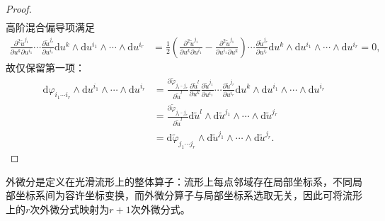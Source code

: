 \documentclass[../../main.tex]{subfiles}%
\begin{document}
\begin{proof}
\begin{align*}
\end{align*}
高阶混合偏导项满足
\begin{align*}
\frac{\partial^2\tilde{u}^{j_1}}{\partial u^k\partial u^{i_1}}\cdots\frac{\partial\tilde{u}^{j_r}}{\partial u^{i_r}}\mathrm{d}u^k\land\mathrm{d}u^{i_1}\land\cdots\land\mathrm{d}u^{i_r} &= \frac{1}{2}\left(\frac{\partial^2\tilde{u}^{j_1}}{\partial u^k\partial u^{i_1}}-\frac{\partial^2\tilde{u}^{j_1}}{\partial u^{i_1}\partial u^k}\right)\cdots\frac{\partial\tilde{u}^{j_r}}{\partial u^{i_r}}\mathrm{d}u^k\land\mathrm{d}u^{i_1}\land\cdots\land\mathrm{d}u^{i_r}=0,
\end{align*}
故仅保留第一项：
\begin{align*}
\mathrm{d}\varphi_{i_1\cdots i_r}\land\mathrm{d}u^{i_1}\land\cdots\land\mathrm{d}u^{i_r} &= \frac{\partial\tilde{\varphi}_{j_1\cdots j_r}}{\partial\tilde{u}^l}\frac{\partial\tilde{u}^l}{\partial u^k}\frac{\partial\tilde{u}^{j_1}}{\partial u^{i_1}}\cdots\frac{\partial\tilde{u}^{j_r}}{\partial u^{i_r}}\mathrm{d}u^k\land\mathrm{d}u^{i_1}\land\cdots\land\mathrm{d}u^{i_r} \\
&= \frac{\partial\tilde{\varphi}_{j_1\cdots j_r}}{\partial\tilde{u}^l}\mathrm{d}\tilde{u}^l\land\mathrm{d}\tilde{u}^{j_1}\land\cdots\land\mathrm{d}\tilde{u}^{j_r} \\
&= \mathrm{d}\tilde{\varphi}_{j_1\cdots j_r}\land\mathrm{d}\tilde{u}^{j_1}\land\cdots\land\mathrm{d}\tilde{u}^{j_r}.
\end{align*}

\end{proof}
\begin{remark}
外微分是定义在光滑流形上的整体算子：流形上每点邻域存在局部坐标系，不同局部坐标系间为容许坐标变换，而外微分算子与局部坐标系选取无关，因此可将流形上的$r$次外微分式映射为$r+1$次外微分式。
\end{remark}
\end{document}
